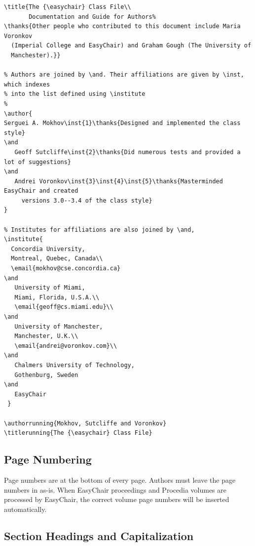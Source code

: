 \documentclass{easychair}
\newcommand{\easychair}{\textsf{easychair}}
\begin{document}

\noindent\small
\begin{verbatim}
\title{The {\easychair} Class File\\
       Documentation and Guide for Authors%
\thanks{Other people who contributed to this document include Maria Voronkov
  (Imperial College and EasyChair) and Graham Gough (The University of
  Manchester).}}

% Authors are joined by \and. Their affiliations are given by \inst, which indexes
% into the list defined using \institute
%
\author{
Serguei A. Mokhov\inst{1}\thanks{Designed and implemented the class style}
\and
   Geoff Sutcliffe\inst{2}\thanks{Did numerous tests and provided a lot of suggestions}
\and
   Andrei Voronkov\inst{3}\inst{4}\inst{5}\thanks{Masterminded EasyChair and created 
     versions 3.0--3.4 of the class style}
}

% Institutes for affiliations are also joined by \and,
\institute{
  Concordia University,
  Montreal, Quebec, Canada\\
  \email{mokhov@cse.concordia.ca}
\and
   University of Miami,
   Miami, Florida, U.S.A.\\
   \email{geoff@cs.miami.edu}\\
\and
   University of Manchester,
   Manchester, U.K.\\
   \email{andrei@voronkov.com}\\
\and
   Chalmers University of Technology,
   Gothenburg, Sweden
\and
   EasyChair
 }

\authorrunning{Mokhov, Sutcliffe and Voronkov}
\titlerunning{The {\easychair} Class File}
\end{verbatim}
\normalsize

\subsection{Page Numbering}
\label{sect:page-numbering}

Page numbers are at the bottom of every page. Authors must leave the
page numbers in as-is. When EasyChair proceedings and Procedia volumes are processed by
EasyChair, the correct volume page numbers will be inserted
automatically.

\subsection{Section Headings and Capitalization}
\label{sect:section-headings}
\end{document}
